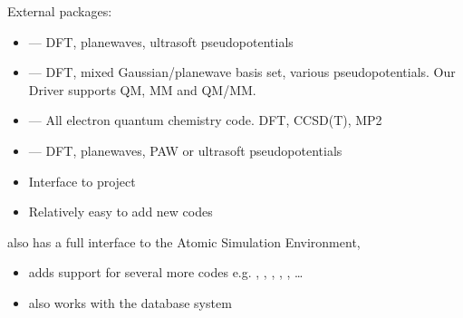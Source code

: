 \documentclass[letterpaper,10pt,english]{sphinxmanual}
\begin{document}
External packages:
\begin{itemize}
\item {} 
— DFT, planewaves, ultrasoft pseudopotentials

\item {} 
 — DFT, mixed Gaussian/planewave basis set, various pseudopotentials.
Our  Driver supports QM, MM and QM/MM.

\item {} 
 — All electron quantum chemistry code. DFT, CCSD(T), MP2

\item {} 
 — DFT, planewaves, PAW or ultrasoft pseudopotentials

\item {} 
Interface to  project

\item {} 
Relatively easy to add new codes

\end{itemize}

 also has a full interface to the Atomic Simulation
Environment, 
\begin{itemize}
\item {} 
 adds support for several more codes e.g. , ,
, , , …

\item {} 
 also works with the  database system

\end{itemize}
\end{document}
